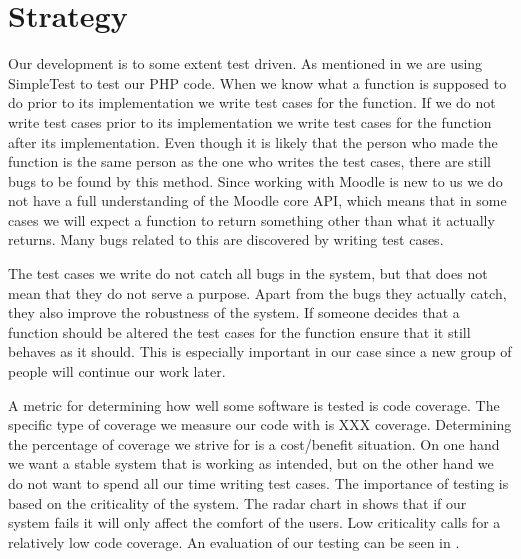 \section{Strategy}
\label{sec:strategy}
Our development is to some extent test driven.
As mentioned in  we are using SimpleTest to test our PHP code.
When we know what a function is supposed to do prior to its implementation we write test cases for the function.
If we do not write test cases prior to its implementation we write test cases for the function after its implementation.
Even though it is likely that the person who made the function is the same person as the one who writes the test cases, there are still bugs to be found by this method.
Since working with Moodle is new to us we do not have a full understanding of the Moodle core API, which means that in some cases we will expect a function to return something other than what it actually returns.
Many bugs related to this are discovered by writing test cases.

The test cases we write do not catch all bugs in the system, but that does not mean that they do not serve a purpose.
Apart from the bugs they actually catch, they also improve the robustness of the system.
If someone decides that a function should be altered the test cases for the function ensure that it still behaves as it should.
This is especially important in our case since a new group of people will continue our work later.

A metric for determining how well some software is tested is code coverage. 
The specific type of coverage we measure our code with is XXX coverage. 
Determining the percentage of coverage we strive for is a cost/benefit situation.
On one hand we want a stable system that is working as intended, but on the other hand we do not want to spend all our time writing test cases.
The importance of testing is based on the criticality of the system.
The radar chart in  shows that if our system fails it will only affect the comfort of the users.
Low criticality calls for a relatively low code coverage.
An evaluation of our testing can be seen in .

